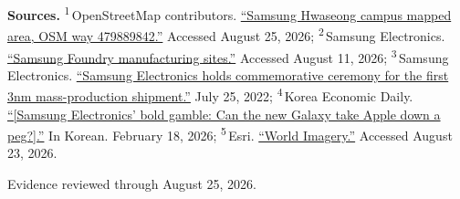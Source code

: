 \begin{minipage}[t][0.90\textheight][t]{\textwidth}
{\sffamily\scriptsize\setlength{\emergencystretch}{1.5em}\textbf{Sources.} \textsuperscript{1}\,OpenStreetMap contributors. \href{\detokenize{https://www.openstreetmap.org/way/479889842}}{\enquote{Samsung Hwaseong campus mapped area, OSM way 479889842.}} Accessed August 25, 2026; \textsuperscript{2}\,Samsung Electronics. \href{\detokenize{https://semiconductor.samsung.com/foundry/manufacturing/manufacturing-sites/}}{\enquote{Samsung Foundry manufacturing sites.}} Accessed August 11, 2026; \textsuperscript{3}\,Samsung Electronics. \href{\detokenize{https://semiconductor.samsung.com/news-events/news/samsung-electronics-holds-commemorative-ceremony-for-the-first-3nm-mass-production-shipment/}}{\enquote{Samsung Electronics holds commemorative ceremony for the first 3nm mass-production shipment.}} July 25, 2022; \textsuperscript{4}\,Korea Economic Daily. \href{\detokenize{https://www.hankyung.com/article/202602189192i}}{\enquote{[Samsung Electronics' bold gamble: Can the new Galaxy take Apple down a peg?].}} In Korean. February 18, 2026; \textsuperscript{5}\,Esri. \href{\detokenize{https://www.arcgis.com/home/item.html?id=10df2279f9684e4a9f6a7f08febac2a9}}{\enquote{World Imagery.}} Accessed August 23, 2026.\par}
\vfill
\noindent{\color{hairline}\rule{\linewidth}{0.4pt}}\par\smallskip
{\sffamily\scriptsize\color{black!58} Evidence reviewed through August 25, 2026.\par}
\end{minipage}
\clearpage
